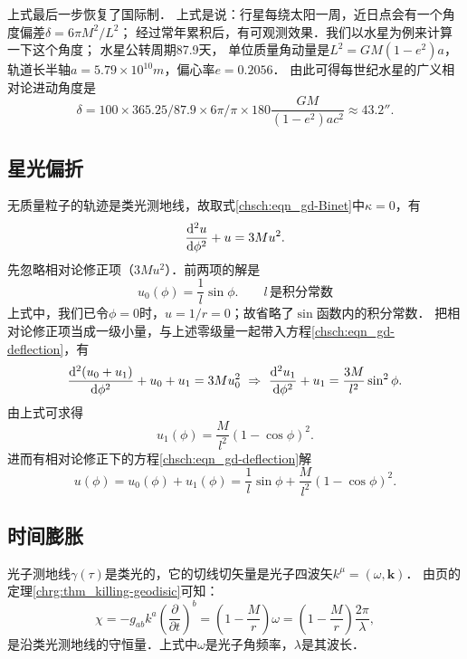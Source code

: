 上式最后一步恢复了国际制．
上式是说：行星每绕太阳一周，近日点会有一个角度偏差$\delta = 6\pi M^2/L^2$；
经过常年累积后，有可观测效果．我们以水星为例来计算一下这个角度；
水星公转周期87.9天，  %
单位质量角动量是$L^2=GM(1-e^2)a$，轨道长半轴$a=5.79\times 10^{10}m$，偏心率$e=0.2056$．
由此可得每世纪水星的广义相对论进动角度是
\begin{equation}
    \delta = 100\times 365.25/87.9\times 6\pi/\pi\times 180 \frac{GM }{(1-e^2)a c^2}
    \approx 43.2'' .
\end{equation}



\subsection{星光偏折}

无质量粒子的轨迹是类光测地线，故取式\eqref{chsch:eqn_gd-Binet}中$\kappa=0$，有
\begin{equation}\label{chsch:eqn_gd-deflection}
    \frac{{\rm d}^2 u}{{\rm d} \phi^2}+u =  3Mu^2.
\end{equation}
先忽略相对论修正项（$3Mu^2$）．前两项的解是
\begin{equation}
    u_0(\phi)= \frac{1}{l} \sin\phi. \qquad    l \, \text{是积分常数}
\end{equation}
上式中，我们已令$\phi=0$时，$u=1/r = 0$；故省略了$\sin$函数内的积分常数．
把相对论修正项当成一级小量，与上述零级量一起带入方程\eqref{chsch:eqn_gd-deflection}，有
\begin{equation}
    \frac{{\rm d}^2 (u_0+u_1)}{{\rm d} \phi^2}+u_0+u_1 =  3Mu_0^2
    \ \Rightarrow \ 
    \frac{{\rm d}^2 u_1}{{\rm d} \phi^2}+u_1 =  \frac{3M}{l^2} \sin^2\phi .
\end{equation}
由上式可求得
\begin{equation}
    u_1(\phi)=\frac{M}{l^2} (1-\cos \phi )^2. 
\end{equation}
进而有相对论修正下的方程\eqref{chsch:eqn_gd-deflection}解
\begin{equation}
    u(\phi)=u_0(\phi)+u_1(\phi)=\frac{1}{l} \sin\phi+\frac{M}{l^2} (1-\cos \phi )^2.
\end{equation}


\subsection{时间膨胀}

光子测地线$\gamma(\tau)$是类光的，它的切线切矢量是光子四波矢$k^\mu=(\omega,\boldsymbol{k})$．
由\pageref{chrg:thm_killing-geodisic}页的定理\ref{chrg:thm_killing-geodisic}可知：
\begin{equation}\label{chsch:eqn_gr-red-shift}
    \chi =- g_{ab} k^a \left(\frac{\partial}{\partial t}\right)^b
    =\left(1-\frac{M}{r}\right) \omega =\left(1-\frac{M}{r}\right) \frac{2\pi}{\lambda},
\end{equation}
是沿类光测地线的守恒量．上式中$\omega$是光子角频率，$\lambda$是其波长．

